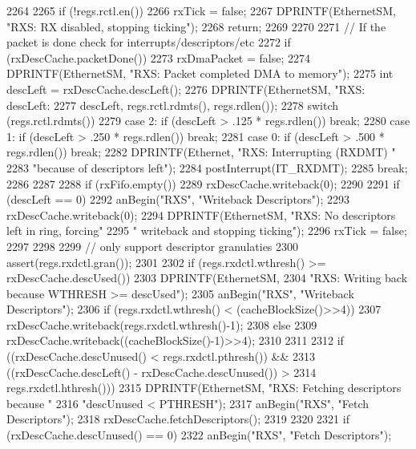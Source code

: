 \begin{DoxyCode}
2264 {
2265     if (!regs.rctl.en()) {
2266         rxTick = false;
2267         DPRINTF(EthernetSM, "RXS: RX disabled, stopping ticking\n");
2268         return;
2269     }
2270 
2271     // If the packet is done check for interrupts/descriptors/etc
2272     if (rxDescCache.packetDone()) {
2273         rxDmaPacket = false;
2274         DPRINTF(EthernetSM, "RXS: Packet completed DMA to memory\n");
2275         int descLeft = rxDescCache.descLeft();
2276         DPRINTF(EthernetSM, "RXS: descLeft: %
2277                 descLeft, regs.rctl.rdmts(), regs.rdlen());
2278         switch (regs.rctl.rdmts()) {
2279           case 2: if (descLeft > .125 * regs.rdlen()) break;
2280           case 1: if (descLeft > .250 * regs.rdlen()) break;
2281           case 0: if (descLeft > .500 * regs.rdlen())  break;
2282             DPRINTF(Ethernet, "RXS: Interrupting (RXDMT) "
2283                     "because of descriptors left\n");
2284             postInterrupt(IT_RXDMT);
2285             break;
2286         }
2287 
2288         if (rxFifo.empty())
2289             rxDescCache.writeback(0);
2290 
2291         if (descLeft == 0) {
2292             anBegin("RXS", "Writeback Descriptors");
2293             rxDescCache.writeback(0);
2294             DPRINTF(EthernetSM, "RXS: No descriptors left in ring, forcing"
2295                     " writeback and stopping ticking\n");
2296             rxTick = false;
2297         }
2298 
2299         // only support descriptor granulaties
2300         assert(regs.rxdctl.gran());
2301 
2302         if (regs.rxdctl.wthresh() >= rxDescCache.descUsed()) {
2303             DPRINTF(EthernetSM,
2304                     "RXS: Writing back because WTHRESH >= descUsed\n");
2305             anBegin("RXS", "Writeback Descriptors");
2306             if (regs.rxdctl.wthresh() < (cacheBlockSize()>>4))
2307                 rxDescCache.writeback(regs.rxdctl.wthresh()-1);
2308             else
2309                 rxDescCache.writeback((cacheBlockSize()-1)>>4);
2310         }
2311 
2312         if ((rxDescCache.descUnused() < regs.rxdctl.pthresh()) &&
2313             ((rxDescCache.descLeft() - rxDescCache.descUnused()) >
2314              regs.rxdctl.hthresh())) {
2315             DPRINTF(EthernetSM, "RXS: Fetching descriptors because "
2316                     "descUnused < PTHRESH\n");
2317             anBegin("RXS", "Fetch Descriptors");
2318             rxDescCache.fetchDescriptors();
2319         }
2320 
2321         if (rxDescCache.descUnused() == 0) {
2322             anBegin("RXS", "Fetch Descriptors");
}}}
\end{DoxyCode}
